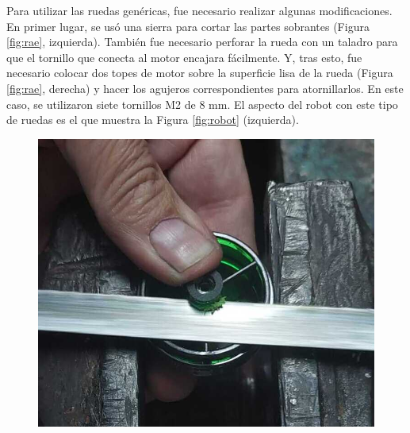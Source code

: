 Para utilizar las ruedas genéricas, fue necesario realizar algunas modificaciones. En primer lugar, se usó una sierra para cortar las partes sobrantes (Figura \ref{fig:rae}, izquierda). También fue necesario perforar la rueda con un taladro para que el tornillo que conecta al motor encajara fácilmente. Y, tras esto, fue necesario colocar dos topes de motor sobre la superficie lisa de la rueda (Figura \ref{fig:rae}, derecha) y hacer los agujeros correspondientes para atornillarlos. En este caso, se utilizaron siete tornillos M2 de 8 mm. El aspecto del robot con este tipo de ruedas es el que muestra la Figura \ref{fig:robot} (izquierda).

\begin{figure}[ht!]
	\centering
	\begin{minipage}{0.40\linewidth}
		\centering
		\includegraphics[width=\linewidth]{figs/cap5/creacionra2.jpeg}


\end{minipage}
\end{figure}
